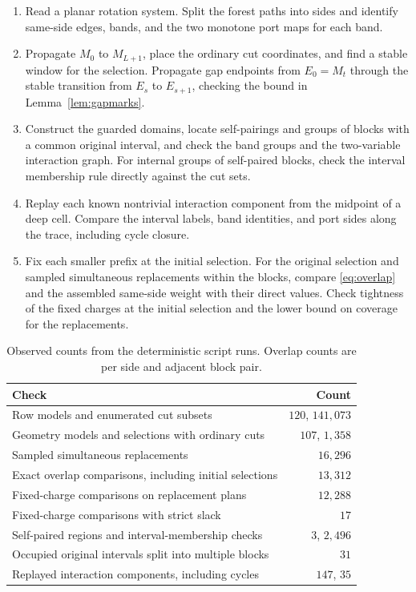 \documentclass[10pt,letterpaper]{article}
\begin{document}
\begin{algorithm}[H]
\caption{Geometry and one-sided charge checks on a fixed selection}
\label{alg:geometry}
\begin{enumerate}
\item Read a planar rotation system. Split the forest paths into sides and identify same-side edges, bands, and the two monotone port maps for each band.
\item Propagate \(M_0\) to \(M_{L+1}\), place the ordinary cut coordinates, and find a stable window for the selection. Propagate gap endpoints from \(E_0=M_t\) through the stable transition from \(E_s\) to \(E_{s+1}\), checking the bound in Lemma~\ref{lem:gapmarks}.
\item Construct the guarded domains, locate self-pairings and groups of blocks with a common original interval, and check the band groups and the two-variable interaction graph. For internal groups of self-paired blocks, check the interval membership rule directly against the cut sets.
\item Replay each known nontrivial interaction component from the midpoint of a deep cell. Compare the interval labels, band identities, and port sides along the trace, including cycle closure.
\item Fix each smaller prefix at the initial selection. For the original selection and sampled simultaneous replacements within the blocks, compare \eqref{eq:overlap} and the assembled same-side weight with their direct values. Check tightness of the fixed charges at the initial selection and the lower bound on coverage for the replacements.
\end{enumerate}
\end{algorithm}

\begin{table}[H]
\centering
\caption{Observed counts from the deterministic script runs. Overlap counts are per side and adjacent block pair.}
\label{tab:tests}
\begin{tabularx}{.95\linewidth}{@{}Xr@{}}
\toprule
Check & Count\\
\midrule
Row models and enumerated cut subsets & \(120\), \(141{,}073\)\\
Geometry models and selections with ordinary cuts & \(107\), \(1{,}358\)\\
Sampled simultaneous replacements & \(16{,}296\)\\
Exact overlap comparisons, including initial selections & \(13{,}312\)\\
Fixed-charge comparisons on replacement plans & \(12{,}288\)\\
Fixed-charge comparisons with strict slack & \(17\)\\
Self-paired regions and interval-membership checks & \(3\), \(2{,}496\)\\
Occupied original intervals split into multiple blocks & \(31\)\\
Replayed interaction components, including cycles & \(147\), \(35\)\\
\bottomrule
\end{tabularx}
\end{table}
\end{document}
